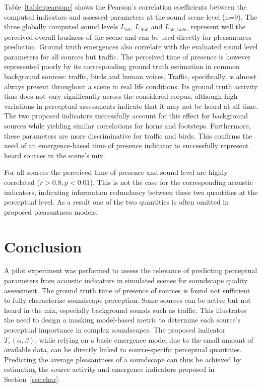 \documentclass{article}
\begin{document}
\begin{sloppy}
Table~\ref{table:pearsonc} shows the Pearson's correlation coefficients between the computed indicators and assessed parameters at the sound scene level (n=9). The three globally computed sound levels $L_{50}$, $L_{A50}$ and $L_{50,1kHz}$ represent well the perceived overall loudness of the scene and can be used directly for pleasantness prediction. Ground truth emergences also correlate with the evaluated sound level parameters for all sources but traffic. The perceived time of presence is however represented poorly by its corresponding ground truth estimation in common background sources: traffic, birds and human voices. Traffic, specifically, is almost always present throughout a scene in real life conditions. Its ground truth activity thus does not vary significantly across the considered corpus, although high variations in perceptual assessments indicate that it may not be heard at all time. The two proposed indicators successfully account for this effect for background sources while yielding similar correlations for horns and footsteps. Furthermore, these parameters are more discriminative for traffic and birds. This confirms the need of an emergence-based time of presence indicator to successfully represent heard sources in the scene's mix.

For all sources the perceived time of presence and sound level are highly correlated ($r>0.8, p<0.01$). This is not the case for the corresponding acoustic indicators, indicating information redundancy between these two quantities at the perceptual level. As a result one of the two quantities is often omitted in proposed pleasantness models.

\section{Conclusion}
\label{sec:disc}

A pilot experiment was performed to assess the relevance of predicting perceptual parameters from acoustic indicators in simulated scenes for soundscape quality assessment. The ground truth time of presence of sources is found not sufficient to fully characterize soundscape perception. Some sources can be active but not heard in the mix, especially background sounds such as traffic. This illustrates the need to design a masking model-based metric to determine each source's perceptual importance in complex soundscapes. The proposed indicator $T_s(\alpha, \beta)$, while relying on a basic emergence model due to the small amount of available data, can be directly linked to source-specific perceptual quantities. Predicting the average pleasantness of a soundscape can thus be achieved by estimating the source activity and emergence indicators proposed in Section~\ref{sec:char}.


\end{sloppy}
\end{document}
